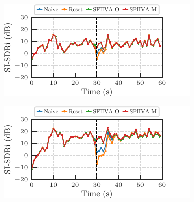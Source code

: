 \documentclass[sip,biber]{now-journal}
\begin{document}
\begin{figure}[t]
  \centering
  \begin{minipage}[t]{.45\textwidth}
    \centering\includegraphics{figures/plots/clean/line_900.pdf}\label{fig:plot:line:900}
  \end{minipage}
  \hspace{.05\textwidth}
  \begin{minipage}[t]{.45\textwidth}
    \centering\includegraphics{figures/plots/clean/line_950.pdf}\label{fig:plot:line:950}
  \end{minipage}


\end{figure}
\end{document}
